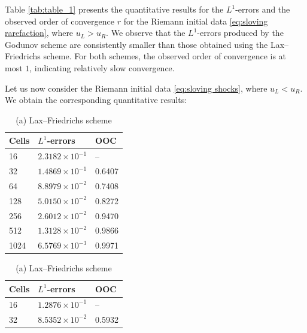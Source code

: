 Table \ref{tab:table_1} presents the quantitative results for the $L^{1}$-errors and the observed order of convergence $r$ for the
Riemann initial data \eqref{eq:sloving rarefaction}, where $u_L > u_R$. We observe that the $L^{1}$-errors produced by the Godunov scheme are consistently smaller than those obtained using the Lax--Friedrichs scheme. For both schemes, the observed order of convergence is at most $1$, indicating relatively slow convergence.

Let us now consider the Riemann initial data \eqref{eq:sloving shocks}, where $u_L < u_R$.
We obtain the corresponding quantitative results:
\begin{table}[H]
    \centering
    \begin{minipage}{0.45\textwidth}
        \centering
        \begin{tabular}{ |p{1.5cm}||p{2.2cm}| |p{1.5cm}| }
            \hline
            \textbf{Cells } & $L^{1}$-\textbf{errors} & \textbf{OOC} \\
            \hline
            16              & $2.3182 \times 10^{-1}$ & --           \\
            32              & $1.4869 \times 10^{-1}$ & 0.6407       \\
            64              & $8.8979 \times 10^{-2}$ & 0.7408       \\
            128             & $5.0150 \times 10^{-2}$ & 0.8272       \\
            256             & $2.6012 \times 10^{-2}$ & 0.9470       \\
            512             & $1.3128 \times 10^{-2}$ & 0.9866       \\
            1024            & $6.5769 \times 10^{-3}$ & 0.9971       \\
            \hline
        \end{tabular}
        \caption*{(a) Lax--Friedrichs scheme}
    \end{minipage}
    \hfill
    \begin{minipage}{0.5\textwidth}
        \centering
        \begin{tabular}{ |p{1.5cm}||p{2.2cm}| |p{1.5cm}| }
            \hline
            \textbf{Cells } & $L^{1}$-\textbf{errors} & \textbf{OOC} \\
            \hline
            16              & $1.2876 \times 10^{-1}$ & --           \\
            32              & $8.5352 \times 10^{-2}$ & 0.5932       \\

\end{tabular}
\end{minipage}
\end{table}
